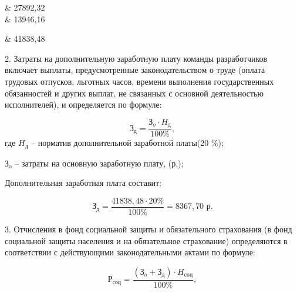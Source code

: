 \begin{table}[!h!t]
\begin{tabular}
		\hline
		                                                                                              & 27892,32                                                                                                            \\

		\hline
		                                                                                       & 13946,16                                                                                                            \\
		\hline

		 & 41838,48                                                                                                            \\
		\hline
	\end{tabular}
\end{table}

2. Затраты на дополнительную заработную плату команды разработчиков включает выплаты, предусмотренные законодательством о труде (оплата трудовых отпусков, льготных часов, времени выполнения государственных обязанностей и других выплат, не связанных с основной деятельностью исполнителей), и определяется по формуле:

\begin{equation}
\text{З}_{\text{д}} = \frac{\text{З}_{o}\cdot H_\text{д}}{100\%},
\end{equation}
где $H_\text{д}$ -- норматив дополнительной              заработной платы(20 \%);

$\text{З}_{\text{o}}$ -- затраты на основную заработную плату, (р.);

Дополнительная заработная плата составит:

$$
	\text{З}_{\text{д}} = \frac{41838,48 \cdot 20\%}{100\%} = 8367,70 \text{ р}.
$$

3. Отчисления в фонд социальной защиты и обязательного страхования (в фонд социальной защиты населения и на обязательное страхование) определяются в соответствии с действующими законодательными актами по формуле:

\begin{equation}
\text{Р}_{\text{соц}} = \frac{(\text{З}_{o} + \text{З}_{\text{д}})\cdot H_\text{соц}}{100\%},
\end{equation}

